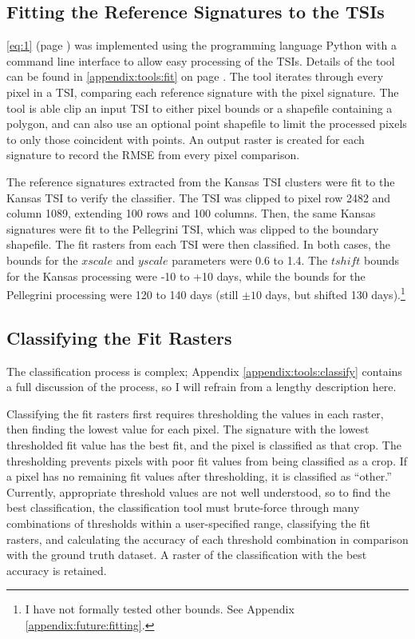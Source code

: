 \subsection{Fitting the Reference Signatures to the TSIs}

\autoref{eq:1} (page \pageref{eq:1}) was implemented using the programming language Python \autocite{python2.7.8} with a command line interface to allow easy processing of the TSIs. Details of the tool can be found in \autoref{appendix:tools:fit} on page \pageref{appendix:tools:fit}. The tool iterates through every pixel in a TSI, comparing each reference signature with the pixel signature. The tool is able clip an input TSI to either pixel bounds or a shapefile containing a polygon, and can also use an optional point shapefile to limit the processed pixels to only those coincident with points. An output raster is created for each signature to record the RMSE from every pixel comparison.

The reference signatures extracted from the Kansas TSI clusters were fit to the Kansas TSI to verify the classifier. The TSI was clipped to pixel row 2482 and column 1089, extending 100 rows and 100 columns. Then, the same Kansas signatures were fit to the Pellegrini TSI, which was clipped to the boundary shapefile. The fit rasters from each TSI were then classified. In both cases, the bounds for the $xscale$ and $yscale$ parameters were 0.6 to 1.4. The $tshift$ bounds for the Kansas processing were -10 to +10 days, while the bounds for the Pellegrini processing were 120 to 140 days (still $\pm10$ days, but shifted 130 days).\footnote{I have not formally tested other bounds. See Appendix \ref{appendix:future:fitting}.}

\subsection{Classifying the Fit Rasters}

The classification process is complex; Appendix \ref{appendix:tools:classify} contains a full discussion of the process, so I will refrain from a lengthy description here.

Classifying the fit rasters first requires thresholding the values in each raster, then finding the lowest value for each pixel. The signature with the lowest thresholded fit value has the best fit, and the pixel is classified as that crop. The thresholding prevents pixels with poor fit values from being classified as a crop. If a pixel has no remaining fit values after thresholding, it is classified as ``other.'' Currently, appropriate threshold values are not well understood, so to find the best classification, the classification tool must brute-force through many combinations of thresholds within a user-specified range, classifying the fit rasters, and calculating the accuracy of each threshold combination in comparison with the ground truth dataset. A raster of the classification with the best accuracy is retained.


